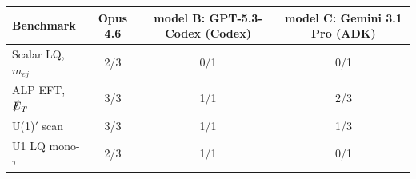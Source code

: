 \begin{tabular}{lccc}
\toprule
Benchmark & Opus 4.6 & model B: GPT-5.3-Codex (Codex) & model C: Gemini 3.1 Pro (ADK) \\
\midrule
Scalar LQ, $m_{ej}$ & 2/3 & 0/1 & 0/1 \\
ALP EFT, $\slashed{E}_T$ & 3/3 & 1/1 & 2/3 \\
U(1)$'$ scan & 3/3 & 1/1 & 1/3 \\
U1 LQ mono-$\tau$ & 2/3 & 1/1 & 0/1 \\
\bottomrule
\end{tabular}
